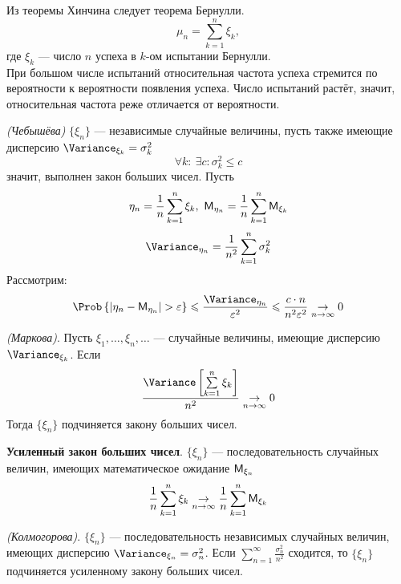 Из теоремы Хинчина следует теорема Бернулли.
	\[
		\mu_n = \sum\limits_{k = 1}^{n} \xi_k,
	\]
	где $\xi_k$ --- число $n$ успеха в $k$-ом испытании Бернулли. \\
При большом числе испытаний относительная частота успеха стремится по вероятности к вероятности появления успеха. Число испытаний растёт, значит, относительная частота реже отличается от вероятности.
\begin{theorem}
	\textit{(Чебышёва)} $\{ \xi_n \}$ --- независимые случайные величины, пусть также имеющие дисперсию $\Variance_{\xi_k} = \sigma_k^2$
\[
	\forall k: \ \exists c: \sigma_k^2 \leqslant c
\]
значит, выполнен закон больших чисел. Пусть 
\[
	\eta_n = \frac{1}{n} \sum\limits_{k = 1}^{n} \xi_k, \ \mathsf{M}_{\eta_n} = \frac{1}{n} \sum\limits_{k = 1}^{n} \mathsf{M}_{\xi_k}
\]
\[
	\Variance_{\eta_n} = \frac{1}{n^2} \sum\limits_{k = 1}^{n} \sigma_k^2
\]
Рассмотрим:
\[
	\Prob \left\{ |\eta_n - \MExpect_{\eta_n} | > \varepsilon \right\} \leqslant \frac{\Variance_{\eta_n}}{\varepsilon^2} \leqslant \frac{c \cdot n}{n^2 \varepsilon^2} \underset{n \to \infty}{\rightarrow} 0
\]
\end{theorem}
\begin{theorem}
	\textit{(Маркова)}. Пусть $\xi_1, \ldots, \xi_n, \ldots$ --- случайные величины, имеющие дисперсию $\Variance_{\xi_k}$. Если
\[
	\frac{\Variance \left[ \sum\limits_{k = 1}^{n} \xi_k \right]}{n^2} \underset{n \to \infty}{\rightarrow} 0
\]
Тогда $\{ \xi_n \}$ подчиняется закону больших чисел.
\end{theorem}
\textbf{Усиленный закон больших чисел}. $\{ \xi_n \}$ --- последовательность случайных величин, имеющих математическое ожидание $\mathsf{M}_{\xi_n}$
\[
	\frac{1}{n} \sum\limits_{k = 1}^{n} {\xi_k} \underset{n \to \infty}{\rightarrow} \frac{1}{n} \sum\limits_{k = 1}^{n} \mathsf{M}_{\xi_k}
\]
\begin{theorem}
	\textit{(Колмогорова)}. $\{ \xi_n \}$ --- последовательность независимых случайных величин, имеющих дисперсию $\Variance_{\xi_n} = \sigma_n^2$. Если $\sum\limits_{n = 1}^{\infty} \frac{\sigma_n^2}{n^2}$ сходится, то $\{ \xi_n \}$ подчиняется усиленному закону больших чисел.
\end{theorem}

